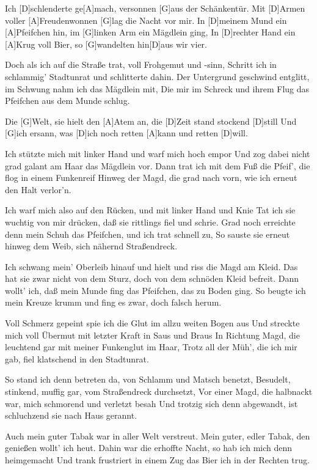 

\begin{guitar}
	Ich [D]schlenderte ge[A]mach, versonnen [G]aus der Schänkentür.
	Mit [D]Armen voller [A]Freudenwonnen [G]lag die Nacht vor mir.
	In [D]meinem Mund ein [A]Pfeifchen hin, im [G]linken Arm ein Mägdlein ging,
	In [D]rechter Hand ein [A]Krug voll Bier, so [G]wandelten hin[D]aus wir vier.
	
	Doch als ich auf die Straße trat, voll Frohgemut und -sinn,
	Schritt ich in schlammig' Stadtunrat und schlitterte dahin.
	Der Untergrund geschwind entglitt, im Schwung nahm ich das Mägdlein mit,
	Die mir im Schreck und ihrem Flug das Pfeifchen aus dem Munde schlug.
	
	Die [G]Welt, sie hielt den [A]Atem an, die [D]Zeit stand stockend [D]still
	Und [G]ich ersann, was [D]ich noch retten [A]kann und retten [D]will.
	
	Ich stützte mich mit linker Hand und warf mich hoch empor
	Und zog dabei nicht grad galant am Haar das Mägdlein vor.
	Dann trat ich mit dem Fuß die Pfeif', die flog in einem Funkenreif
	Hinweg der Magd, die grad nach vorn, wie ich erneut den Halt verlor'n.
	
	Ich warf mich also auf den Rücken, und mit linker Hand und Knie
	Tat ich sie wuchtig von mir drücken, daß sie rittlings fiel und schrie.
	Grad noch erreichte denn mein Schuh das Pfeifchen, und ich trat schnell zu,
	So sauste sie erneut hinweg dem Weib, sich nähernd Straßendreck.
	
	 
	
	Ich schwang mein' Oberleib hinauf und hielt und riss die Magd am Kleid.
	Das hat sie zwar nicht von dem Sturz, doch von dem schnöden Kleid befreit.
	Dann wollt' ich, daß mein Munde fing das Pfeifchen, das zu Boden ging.
	So beugte ich mein Kreuze krumm und fing es zwar, doch falsch herum.
	
	Voll Schmerz gepeint spie ich die Glut im allzu weiten Bogen aus
	Und streckte mich voll Übermut mit letzter Kraft in Saus und Braus
	In Richtung Magd, die leuchtend gar mit meiner Funkenglut im Haar,
	Trotz all der Müh', die ich mir gab, fiel klatschend in den Stadtunrat.
	
	 
	
	So stand ich denn betreten da, von Schlamm und Matsch benetzt,
	Besudelt, stinkend, muffig gar, vom Straßendreck durchsetzt,
	Vor einer Magd, die halbnackt war, mich schmorend und verletzt besah
	Und trotzig sich denn abgewandt, ist schluchzend sie nach Haus gerannt.
	
	Auch mein guter Tabak war in aller Welt verstreut.
	Mein guter, edler Tabak, den genießen wollt' ich heut.
	Dahin war die erhoffte Nacht, so hab ich mich denn heimgemacht
	Und trank frustriert in einem Zug das Bier ich in der Rechten trug.
\end{guitar}